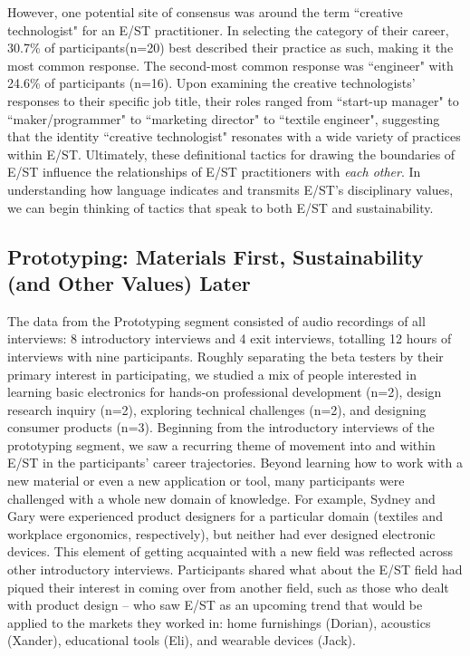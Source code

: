 \documentclass[manuscript,review,anonymous]{acmart}
\begin{document}
However, one potential site of consensus was around the term ``creative technologist" for an E/ST practitioner. In selecting the category of their career, 30.7\% of participants(n=20) best described their practice as such, making it the most common response. The second-most common response was ``engineer" with 24.6\% of participants (n=16). Upon examining the creative technologists' responses to their specific job title, their roles ranged from ``start-up manager" to ``maker/programmer" to ``marketing director" to ``textile engineer", suggesting that the identity ``creative technologist" resonates with a wide variety of practices within E/ST. Ultimately, these definitional tactics for drawing the boundaries of E/ST influence the relationships of E/ST practitioners with \textit{each other}. In understanding how language indicates and transmits E/ST's disciplinary values, we can begin thinking of tactics that speak to both E/ST and sustainability.

\subsection{Prototyping: Materials First, Sustainability (and Other Values) Later}
The data from the Prototyping segment consisted of audio recordings of all interviews: 8 introductory interviews and 4 exit interviews, totalling 12 hours of interviews with nine participants. Roughly separating the beta testers by their primary interest in participating, we studied a mix of people interested in learning basic electronics for hands-on professional development (n=2), design research inquiry (n=2), exploring technical challenges (n=2), and designing consumer products (n=3).
Beginning from the introductory interviews of the prototyping segment, we saw a recurring theme of movement into and within E/ST in the participants' career trajectories. 
Beyond learning how to work with a new material or even a new application or tool, many participants were challenged with a whole new domain of knowledge. For example, Sydney and Gary were experienced product designers for a particular domain (textiles and workplace ergonomics, respectively), but neither had ever designed electronic devices. This element of getting acquainted with a new field was reflected across other introductory interviews. Participants shared what about the E/ST field had piqued their interest in coming over from another field, such as those who dealt with product design -- who saw E/ST as an upcoming trend that would be applied to the markets they worked in: home furnishings (Dorian), acoustics (Xander), educational tools (Eli), and wearable devices (Jack).
\end{document}
